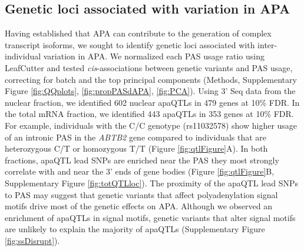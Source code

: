 \begin{figure}[!htb]
\end{figure}
  
  


\subsection{Genetic loci associated with variation in APA}\label{apa-QTLs}

Having established that APA can contribute to the generation of complex transcript isoforms, we sought to identify genetic loci associated with inter-individual variation in APA. We normalized each PAS usage ratio using LeafCutter  \citep{li_annotation-free_2018} and tested {\it cis}-associations between genetic variants and PAS usage, correcting for batch and the top principal components (Methods, Supplementary Figure \ref{fig:QQplots}, \ref{fig:propPASdAPA}, \ref{fig:PCA}). Using 3' Seq data from the nuclear fraction, we identified 602 nuclear apaQTLs in 479 genes at 10\% FDR. In the total mRNA fraction, we identified 443 apaQTLs in 353 genes at 10\% FDR. For example, individuals with the C/C genotype (rs11032578) show higher usage of an intronic PAS in the {\it ABTB2} gene compared to individuals that are heterozygous C/T or homozygous T/T (Figure \ref{fig:qtlFigure}A). In both fractions, apaQTL lead SNPs are enriched near the PAS they most strongly correlate with and near the 3' ends of gene bodies (Figure \ref{fig:qtlFigure}B, Supplementary Figure \ref{fig:totQTLloc}). The proximity of the apaQTL lead SNPs to PAS may suggest that genetic variants that affect polyadenylation signal motifs drive most of the genetic effects on APA. Although we observed an enrichment of apaQTLs in signal motifs, genetic variants that alter signal motifs are unlikely to explain the majority of apaQTLs (Supplementary Figure \ref{fig:ssDisrupt}).

